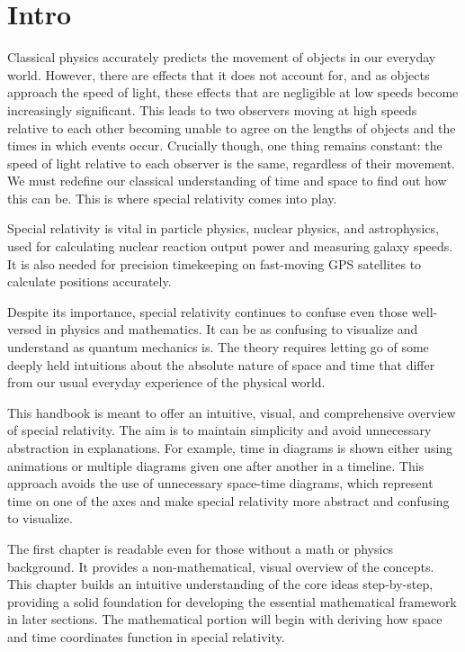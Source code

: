 \frontmatter
\chapter{Intro}

Classical physics accurately predicts the movement of objects in our everyday world.
However, there are effects that it does not account for, and as objects approach the speed of light, these effects that are negligible at low speeds become increasingly significant.
This leads to two observers moving at high speeds relative to each other becoming unable to agree on the lengths of objects and the times in which events occur.
Crucially though, one thing remains constant: the speed of light relative to each observer is the same, regardless of their movement.
We must redefine our classical understanding of time and space to find out how this can be.
This is where special relativity comes into play.

Special relativity is vital in particle physics, nuclear physics, and astrophysics, used for calculating nuclear reaction output power and measuring galaxy speeds.
It is also needed for precision timekeeping on fast-moving GPS satellites to calculate positions accurately.

Despite its importance, special relativity continues to confuse even those well-versed in physics and mathematics.
It can be as confusing to visualize and understand as quantum mechanics is.
The theory requires letting go of some deeply held intuitions about the absolute nature of space and time that differ from our usual everyday experience of the physical world.

This handbook is meant to offer an intuitive, visual, and comprehensive overview of special relativity.
The aim is to maintain simplicity and avoid unnecessary abstraction in explanations.
For example, time in diagrams is shown either using animations or multiple diagrams given one after another in a timeline.
This approach avoids the use of unnecessary space-time diagrams, which represent time on one of the axes and make special relativity more abstract and confusing to visualize.

The first chapter is readable even for those without a math or physics background.
It provides a non-mathematical, visual overview of the concepts.
This chapter builds an intuitive understanding of the core ideas step-by-step, providing a solid foundation for developing the essential mathematical framework in later sections.
The mathematical portion will begin with deriving how space and time coordinates function in special relativity.


